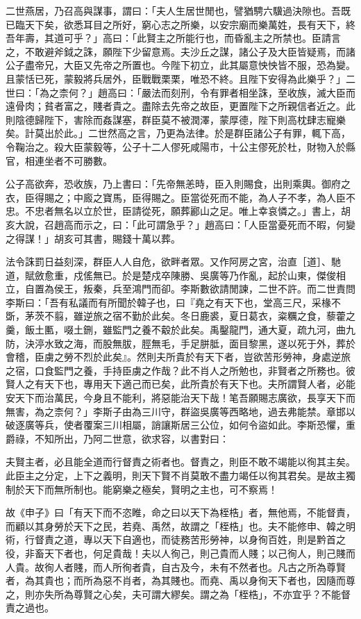 \begin{pinyinscope}
二世燕居，乃召高與謀事，謂曰：「夫人生居世閒也，譬猶騁六驥過決隙也。吾既已臨天下矣，欲悉耳目之所好，窮心志之所樂，以安宗廟而樂萬姓，長有天下，終吾年壽，其道可乎？」高曰：「此賢主之所能行也，而昏亂主之所禁也。臣請言之，不敢避斧鉞之誅，願陛下少留意焉。夫沙丘之謀，諸公子及大臣皆疑焉，而諸公子盡帝兄，大臣又先帝之所置也。今陛下初立，此其屬意怏怏皆不服，恐為變。且蒙恬已死，蒙毅將兵居外，臣戰戰栗栗，唯恐不終。且陛下安得為此樂乎？」二世曰：「為之柰何？」趙高曰：「嚴法而刻刑，令有罪者相坐誅，至收族，滅大臣而遠骨肉；貧者富之，賤者貴之。盡除去先帝之故臣，更置陛下之所親信者近之。此則陰德歸陛下，害除而姦謀塞，群臣莫不被潤澤，蒙厚德，陛下則高枕肆志寵樂矣。計莫出於此。」二世然高之言，乃更為法律。於是群臣諸公子有罪，輒下高，令鞠治之。殺大臣蒙毅等，公子十二人僇死咸陽市，十公主僇死於杜，財物入於縣官，相連坐者不可勝數。

公子高欲奔，恐收族，乃上書曰：「先帝無恙時，臣入則賜食，出則乘輿。御府之衣，臣得賜之；中廄之寶馬，臣得賜之。臣當從死而不能，為人子不孝，為人臣不忠。不忠者無名以立於世，臣請從死，願葬酈山之足。唯上幸哀憐之。」書上，胡亥大說，召趙高而示之，曰：「此可謂急乎？」趙高曰：「人臣當憂死而不暇，何變之得謀！」胡亥可其書，賜錢十萬以葬。

法令誅罰日益刻深，群臣人人自危，欲畔者眾。又作阿房之宮，治直［道］、馳道，賦斂愈重，戍傜無已。於是楚戍卒陳勝、吳廣等乃作亂，起於山東，傑俊相立，自置為侯王，叛秦，兵至鴻門而卻。李斯數欲請閒諫，二世不許。而二世責問李斯曰：「吾有私議而有所聞於韓子也，曰『堯之有天下也，堂高三尺，采椽不斲，茅茨不翦，雖逆旅之宿不勤於此矣。冬日鹿裘，夏日葛衣，粢糲之食，藜藿之羹，飯土匭，啜土鉶，雖監門之養不觳於此矣。禹鑿龍門，通大夏，疏九河，曲九防，決渟水致之海，而股無胈，脛無毛，手足胼胝，面目黎黑，遂以死于外，葬於會稽，臣虜之勞不烈於此矣』。然則夫所貴於有天下者，豈欲苦形勞神，身處逆旅之宿，口食監門之養，手持臣虜之作哉？此不肖人之所勉也，非賢者之所務也。彼賢人之有天下也，專用天下適己而已矣，此所貴於有天下也。夫所謂賢人者，必能安天下而治萬民，今身且不能利，將惡能治天下哉！笔吾願賜志廣欲，長享天下而無害，為之柰何？」李斯子由為三川守，群盜吳廣等西略地，過去弗能禁。章邯以破逐廣等兵，使者覆案三川相屬，誚讓斯居三公位，如何令盜如此。李斯恐懼，重爵祿，不知所出，乃阿二世意，欲求容，以書對曰：

夫賢主者，必且能全道而行督責之術者也。督責之，則臣不敢不竭能以徇其主矣。此臣主之分定，上下之義明，則天下賢不肖莫敢不盡力竭任以徇其君矣。是故主獨制於天下而無所制也。能窮樂之極矣，賢明之主也，可不察焉！

故《申子》曰「有天下而不恣睢，命之曰以天下為桎梏」者，無他焉，不能督責，而顧以其身勞於天下之民，若堯、禹然，故謂之「桎梏」也。夫不能修申、韓之明術，行督責之道，專以天下自適也，而徒務苦形勞神，以身徇百姓，則是黔首之役，非畜天下者也，何足貴哉！夫以人徇己，則己貴而人賤；以己徇人，則己賤而人貴。故徇人者賤，而人所徇者貴，自古及今，未有不然者也。凡古之所為尊賢者，為其貴也；而所為惡不肖者，為其賤也。而堯、禹以身徇天下者也，因隨而尊之，則亦失所為尊賢之心矣，夫可謂大繆矣。謂之為「桎梏」，不亦宜乎？不能督責之過也。


\end{pinyinscope}
